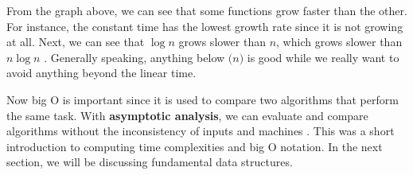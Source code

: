 \documentclass[../../../main.tex]{subfiles}
\begin{document}
From the graph above, we can see that some functions grow faster
than the other. For instance, the constant time has the lowest
growth rate since it is not growing at all. Next, we can see
that $\log{n}$ grows slower than $n$, which grows slower than
$n \log{n}$ \cite{CS02-5}. Generally speaking, anything below
$\mathcal(n)$ is good while we really want to avoid anything
beyond the linear time.

Now big O is important since it is used to compare two algorithms
that perform the same task. With \textbf{asymptotic analysis},
we can evaluate and compare algorithms without the inconsistency
of inputs and machines \cite{CS02-5}. This was a short introduction
to computing time complexities and big O notation. In the next
section, we will be discussing fundamental data structures.
\end{document}
